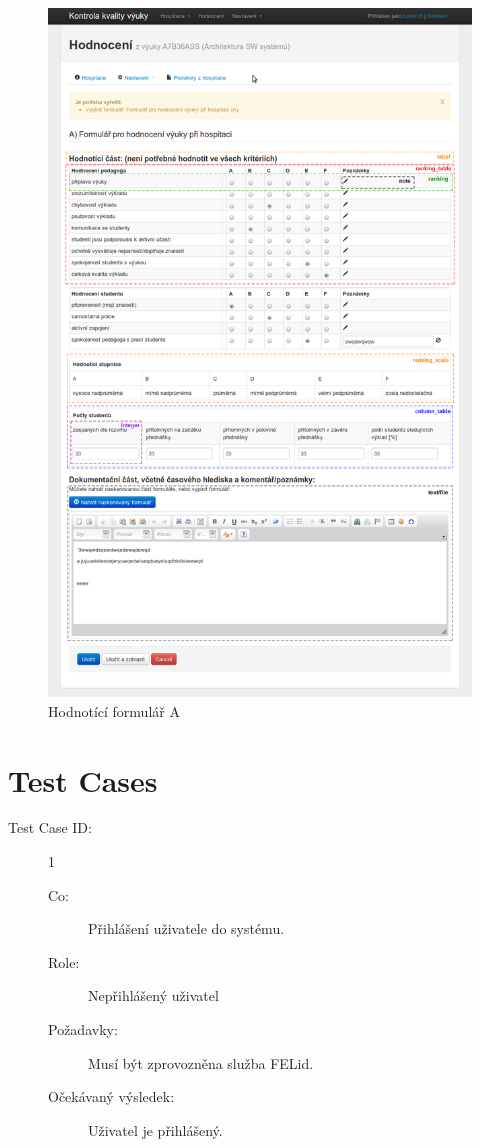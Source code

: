\begin{figure}[H]
\begin{center}
\includegraphics[width=14cm]{figures/form_A}
\caption{Hodnotící formulář A}
\label{fig:form_a}
\end{center}
\end{figure}

\chapter{Test Cases}
\label{test}
\begin{description}
\item[Test Case ID:] 1
\begin{description}
\item[Co:] Přihlášení uživatele do systému.
\item[Role:] Nepřihlášený uživatel
\item[Požadavky:] Musí být zprovozněna služba FELid.
\item[Očekávaný výsledek:] Uživatel je přihlášený.
\end{description}
\end{description}

